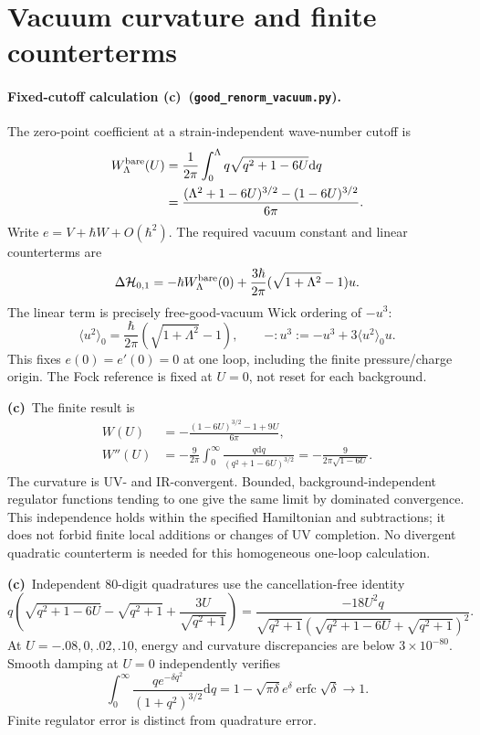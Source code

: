 \documentclass[11pt,a4paper]{article}
\newcommand{\C}{\textbf{(c)}\ }
\newcommand{\dd}{\mathrm d}
\newcommand{\file}[1]{\nolinkurl{#1}}
\newcommand{\vac}{\file{good_renorm_vacuum.py}}
\begin{document}
\section{Vacuum curvature and finite counterterms}
\paragraph{Fixed-cutoff calculation \C (\vac).}
The zero-point coefficient at a strain-independent wave-number cutoff is
\begin{align}
 W_\Lambda^{\rm bare}(U)&=\frac1{2\pi}\int_0^\Lambda
 q\sqrt{q^2+1-6U}\dd q\\
 &=\frac{(\Lambda^2+1-6U)^{3/2}-(1-6U)^{3/2}}{6\pi}.
\end{align}
Write $e=V+\hbar W+O(\hbar^2)$. The required vacuum constant and linear
counterterms are
\begin{equation}
 \Delta\mathcal H_{0,1}=-\hbar W_\Lambda^{\rm bare}(0)
 +\frac{3\hbar}{2\pi}(\sqrt{1+\Lambda^2}-1)u.\label{eq:linear}
\end{equation}
The linear term is precisely free-good-vacuum Wick ordering of $-u^3$:
\begin{equation}
 \langle u^2\rangle_0=\frac{\hbar}{2\pi}(\sqrt{1+\Lambda^2}-1),
 \qquad -:u^3:=-u^3+3\langle u^2\rangle_0u.
\end{equation}
This fixes $e(0)=e'(0)=0$ at one loop, including the finite pressure/charge
origin. The Fock reference is fixed at $U=0$, not reset for each background.

\C The finite result is
\begin{align}
 W(U)&=-\frac{(1-6U)^{3/2}-1+9U}{6\pi},\label{eq:W}\\
 W''(U)&=-\frac9{2\pi}\int_0^\infty
 \frac{q\dd q}{(q^2+1-6U)^{3/2}}
 =-\frac9{2\pi\sqrt{1-6U}}.\label{eq:Wpp}
\end{align}
The curvature is UV- and IR-convergent. Bounded, background-independent
regulator functions tending to one give the same limit by dominated
convergence. This independence holds within the specified Hamiltonian and
subtractions; it does not forbid finite local additions or changes of UV
completion. No divergent quadratic counterterm is needed for this
homogeneous one-loop calculation.

\C Independent 80-digit quadratures use the cancellation-free identity
\begin{equation}
 q\left(\sqrt{q^2+1-6U}-\sqrt{q^2+1}
       +\frac{3U}{\sqrt{q^2+1}}\right)
 =\frac{-18U^2q}{\sqrt{q^2+1}(\sqrt{q^2+1-6U}+\sqrt{q^2+1})^2}.
\end{equation}
At $U=-.08,0,.02,.10$, energy and curvature discrepancies are below
$3\times10^{-80}$. Smooth damping at $U=0$ independently verifies
\begin{equation}
 \int_0^\infty\frac{q e^{-\delta q^2}}{(1+q^2)^{3/2}}\dd q
 =1-\sqrt{\pi\delta}e^\delta\operatorname{erfc}\sqrt\delta\longrightarrow1.
\end{equation}
Finite regulator error is distinct from quadrature error.
\end{document}
